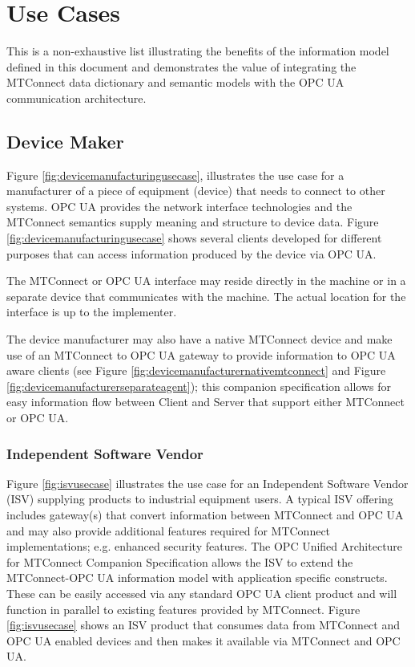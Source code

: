 \section{Use Cases}

This is a non-exhaustive list illustrating the benefits of the  information model defined in this document and demonstrates the value of integrating the MTConnect data dictionary and semantic models with the OPC UA communication architecture.

\subsection{Device Maker}

Figure \ref{fig:devicemanufacturingusecase}, illustrates the use case for a manufacturer of a piece of equipment (device) that needs to connect to other systems. OPC UA provides the network interface technologies and the MTConnect semantics supply meaning and structure to device data. Figure \ref{fig:devicemanufacturingusecase} shows several clients developed for different purposes that can access information produced by the device via OPC UA.


\FloatBarrier

The MTConnect or OPC UA interface may reside directly in the machine or in a separate device that communicates with the machine. The actual location for the interface is up to the implementer.

The device manufacturer may also have a native MTConnect device and make use of an MTConnect to OPC UA gateway to provide  information to OPC UA aware clients (see Figure \ref{fig:devicemanufacturernativemtconnect} and Figure \ref{fig:devicemanufacturerseparateagent}); this companion specification allows for easy information flow between Client and Server that support either MTConnect or OPC UA.





\FloatBarrier

\FloatBarrier

\subsubsection{Independent Software Vendor}

Figure \ref{fig:isvusecase} illustrates the use case for an Independent Software Vendor (ISV) supplying products to industrial equipment users. A typical ISV offering includes gateway(s) that convert information between MTConnect and OPC UA and may also provide additional features required for MTConnect implementations; e.g. enhanced security features. The OPC Unified Architecture for MTConnect Companion Specification allows the ISV to extend the MTConnect-OPC UA information model with application specific constructs. These can be easily accessed via any standard OPC UA client product and will function in parallel to existing features provided by MTConnect. Figure \ref{fig:isvusecase} shows an ISV product that consumes data from MTConnect and OPC UA enabled devices and then makes it available via MTConnect and OPC UA.

